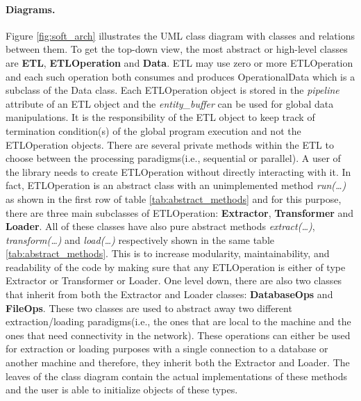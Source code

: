 \paragraph{Diagrams.}
Figure \ref{fig:soft_arch} illustrates the UML class diagram with classes and relations between them. 
To get the top-down view, the most abstract or high-level classes are \textbf{ETL}, \textbf{ETLOperation} 
and \textbf{Data}. ETL may use zero or more ETLOperation and each such operation both consumes and 
produces OperationalData which is a subclass of the Data class. Each ETLOperation object is stored in 
the \textit{pipeline} attribute of an ETL object and the \textit{entity\_buffer} can be used for 
global data manipulations. It is the responsibility of the ETL object to keep track of termination 
condition(s) of the 
global program execution and not the ETLOperation objects. There are several private methods within 
the ETL to choose between the processing paradigms(i.e., sequential or parallel). A user of the 
library needs to create ETLOperation without directly interacting with it. In fact, ETLOperation is 
an abstract class with an unimplemented method \textit{run(\ldots)} as shown in the first row of table 
\ref{tab:abstract_methods} and for this purpose, there are three main subclasses of ETLOperation: 
\textbf{Extractor}, \textbf{Transformer} and \textbf{Loader}. All of these classes have also pure abstract 
methods \textit{extract(\ldots)}, \textit{transform(\ldots)} and \textit{load(\ldots)} respectively shown 
in the same table \ref{tab:abstract_methods}. This is to increase 
modularity, maintainability, and readability of the code by making sure that any ETLOperation is either of 
type Extractor or Transformer or Loader. One level down, there are also two classes that inherit from both 
the Extractor and Loader classes: \textbf{DatabaseOps} and \textbf{FileOps}. These two classes are used 
to abstract away two different extraction/loading paradigms(i.e., the ones that are local to the machine 
and the ones that need connectivity in the network). These operations can either be used for extraction or 
loading purposes with a single connection to a database or another machine and therefore, they inherit 
both the Extractor and Loader. The leaves of the class diagram contain the actual implementations of 
these methods and the user is able to initialize objects of these types.


